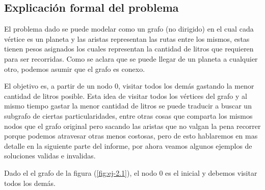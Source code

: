 \subsection{Explicación formal del problema}

El problema dado se puede modelar como un grafo (no dirigido) en el cual cada v\'ertice es un planeta y las aristas representan las rutas entre los mismos, estas tienen pesos asignados los cuales representan la cantidad de litros que requieren para ser recorridas. Como se aclara que se puede llegar de un planeta a cualquier otro, podemos asumir que el grafo es conexo.

El objetivo es, a partir de un nodo 0, visitar todos los demás gastando la menor cantidad de litros posible. Esta idea de visitar todos los v\'ertices del grafo y al mismo tiempo gastar la menor cantidad de litros se puede traducir a buscar un subgrafo de ciertas particularidades, entre otras cosas que comparta los mismos nodos que el grafo original pero sacando las aristas que no valgan la pena recorrer porque podemos atravesar otras menos costosas, pero de esto hablaremos en mas detalle en la siguiente parte del informe, por ahora veamos algunos ejemplos de soluciones validas e invalidas.

Dado el el grafo de la figura (\ref{fig:ej-2.1}), el nodo 0 es el inicial y debemos visitar todos los demás.

